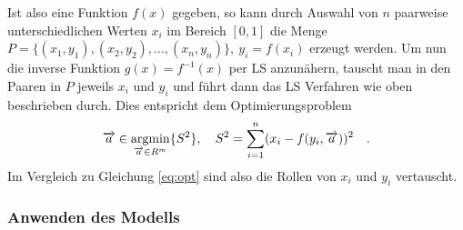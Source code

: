 Ist also eine Funktion $f(x)$ gegeben, so kann durch Auswahl von $n$ paarweise unterschiedlichen Werten $x_i$ im Bereich $[0,1]$ die Menge $P = \{ (x_1, y_1), (x_2, y_2), \dots, (x_n, y_n) \},\ y_i = f(x_i)$ erzeugt werden. Um nun die inverse Funktion $g(x) = f^{-1}(x)$ per LS anzunähern, tauscht man in den Paaren in $P$ jeweils $x_i$ und $y_i$ und führt dann das LS Verfahren wie oben beschrieben durch. Dies entspricht dem Optimierungsproblem
\begin{equation}
\begin{split}
\overrightarrow{a} \in \mathop{\mathrm{argmin}}_{\overrightarrow{a} \in R^m} \{ S^2 \}, \quad
S^2 =  \sum_{i=1}^{n} (x_i - f(y_i, \overrightarrow{a}))^2\quad.
\end{split}
\end{equation}
Im Vergleich zu Gleichung \ref{eq:opt} sind also die Rollen von $x_i$ und $y_i$ vertauscht.

\subsubsection{Anwenden des Modells}
\label{subsubsec:anwenden}

